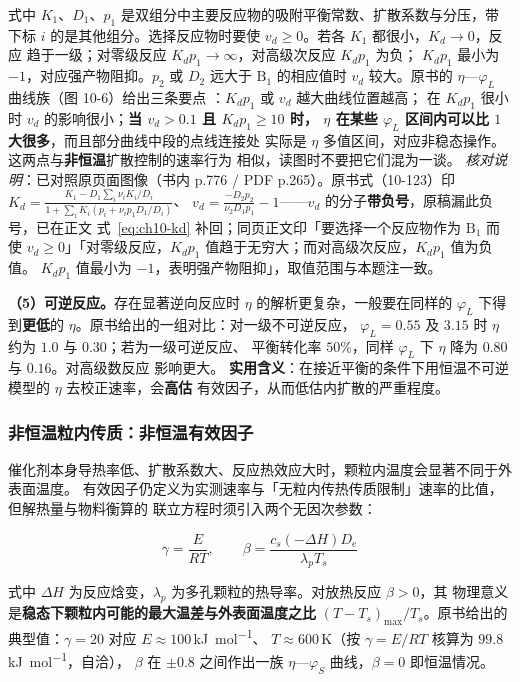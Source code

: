 式中 $K_1$、$D_1$、$p_1$ 是双组分中主要反应物的吸附平衡常数、扩散系数与分压，带下标
$i$ 的是其他组分。选择反应物时要使 $v_d\ge0$。若各 $K_1$ 都很小，$K_d\to0$，反应
趋于一级；对零级反应 $K_dp_1\to\infty$，对高级次反应 $K_dp_1$ 为负；
$K_dp_1$ 最小为 $-1$，对应强产物阻抑。$p_2$ 或 $D_2$ 远大于 $\mathrm{B_1}$ 的相应值时
$v_d$ 较大。原书的 $\eta$—$\varphi_L$ 曲线族（图 10-6）给出三条要点
：$K_dp_1$ 或 $v_d$ 越大曲线位置越高；
在 $K_dp_1$ 很小时 $v_d$ 的影响很小；\textbf{当 $v_d>0.1$ 且 $K_dp_1\ge10$ 时，
$\eta$ 在某些 $\varphi_L$ 区间内可以比 $1$ 大很多}，而且部分曲线中段的点线连接处
实际是 $\eta$ 多值区间，对应非稳态操作。这两点与\textbf{非恒温}扩散控制的速率行为
相似，读图时不要把它们混为一谈。
\emph{核对说明}：已对照原页面图像（书内 p.776 / PDF p.265）。原书式（10-123）印
$K_d=\frac{K_1-D_1\sum_i\nu_iK_i/D_i}{1+\sum_iK_i(p_i+\nu_ip_1D_1/D_i)}$、
$v_d=\frac{-D_2p_2}{\nu_2D_1p_1}-1$——$v_d$ 的分子\textbf{带负号}，原稿漏此负号，已在正文
式~\eqref{eq:ch10-kd} 补回；同页正文印「要选择一个反应物作为 $\mathrm{B_1}$ 而使
$v_d\ge0$」「对零级反应，$K_dp_1$ 值趋于无穷大；而对高级次反应，$K_dp_1$ 值为负值。
$K_dp_1$ 值最小为 $-1$，表明强产物阻抑」，取值范围与本题注一致。

\textbf{（5）可逆反应。}存在显著逆向反应时 $\eta$ 的解析更复杂，一般要在同样的
$\varphi_L$ 下得到\textbf{更低}的 $\eta$。原书给出的一组对比：对一级不可逆反应，
$\varphi_L=0.55$ 及 $3.15$ 时 $\eta$ 约为 $1.0$ 与 $0.30$；若为一级可逆反应、
平衡转化率 $50\%$，同样 $\varphi_L$ 下 $\eta$ 降为 $0.80$ 与 $0.16$。对高级数反应
影响更大。
\textbf{实用含义}：在接近平衡的条件下用恒温不可逆模型的 $\eta$ 去校正速率，会\textbf{高估}
有效因子，从而低估内扩散的严重程度。

\subsubsection{非恒温粒内传质：非恒温有效因子}

催化剂本身导热率低、扩散系数大、反应热效应大时，颗粒内温度会显著不同于外表面温度。
有效因子仍定义为实测速率与「无粒内传热传质限制」速率的比值，但解热量与物料衡算的
联立方程时须引入两个无因次参数：

\begin{equation}
\gamma=\frac{E}{RT},\qquad
\beta=\frac{c_s(-\Delta H)D_e}{\lambda_pT_s}
\label{eq:ch10-gammabeta}
\end{equation}

式中 $\Delta H$ 为反应焓变，$\lambda_p$ 为多孔颗粒的热导率。对放热反应 $\beta>0$，其
物理意义是\textbf{稳态下颗粒内可能的最大温差与外表面温度之比}
$(T-T_s)_{\max}/T_s$。原书给出的典型值：$\gamma=20$ 对应 $E\approx100$\,\unit{kJ.mol^{-1}}、
$T\approx600$\,\unit{K}（按 $\gamma=E/RT$ 核算为 $99.8$\,\unit{kJ.mol^{-1}}，自洽），
$\beta$ 在 $\pm0.8$ 之间作出一族 $\eta$—$\varphi_S$ 曲线，$\beta=0$ 即恒温情况。

